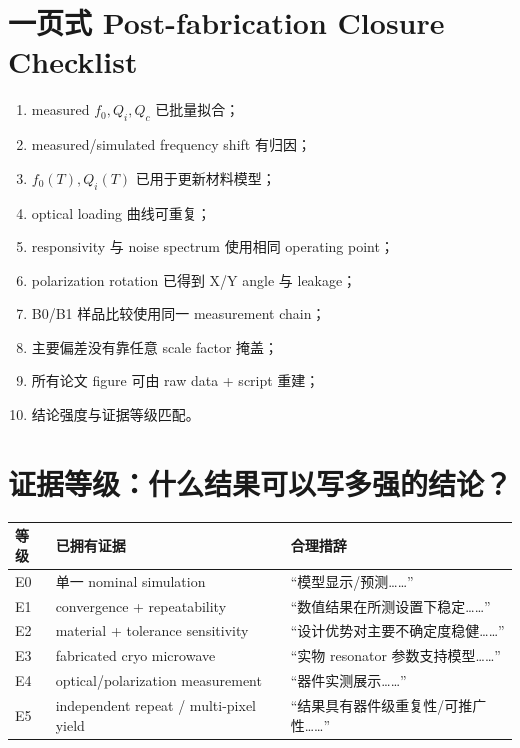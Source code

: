 \documentclass[11pt,a4paper,openany]{ctexrep}
\begin{document}
\section{一页式 Post-fabrication Closure Checklist}

\begin{notebookbox}[title=Post-fabrication closure]
\begin{enumerate}
  \item[$\square$] measured $f_0,Q_i,Q_c$ 已批量拟合；
  \item[$\square$] measured/simulated frequency shift 有归因；
  \item[$\square$] $f_0(T),Q_i(T)$ 已用于更新材料模型；
  \item[$\square$] optical loading 曲线可重复；
  \item[$\square$] responsivity 与 noise spectrum 使用相同 operating point；
  \item[$\square$] polarization rotation 已得到 X/Y angle 与 leakage；
  \item[$\square$] B0/B1 样品比较使用同一 measurement chain；
  \item[$\square$] 主要偏差没有靠任意 scale factor 掩盖；
  \item[$\square$] 所有论文 figure 可由 raw data + script 重建；
  \item[$\square$] 结论强度与证据等级匹配。
\end{enumerate}
\end{notebookbox}

\section{证据等级：什么结果可以写多强的结论？}

\begin{center}
\begin{tabularx}{\textwidth}{p{2cm}X X}
\toprule
等级 & 已拥有证据 & 合理措辞 \\
\midrule
E0 & 单一 nominal simulation & ``模型显示/预测……'' \\
E1 & convergence + repeatability & ``数值结果在所测设置下稳定……'' \\
E2 & material + tolerance sensitivity & ``设计优势对主要不确定度稳健……'' \\
E3 & fabricated cryo microwave & ``实物 resonator 参数支持模型……'' \\
E4 & optical/polarization measurement & ``器件实测展示……'' \\
E5 & independent repeat / multi-pixel yield & ``结果具有器件级重复性/可推广性……'' \\
\bottomrule
\end{tabularx}
\end{center}
\end{document}
